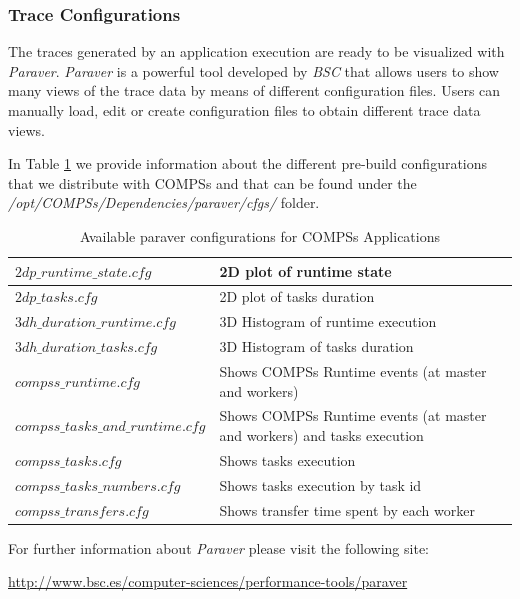 \subsubsection{Trace Configurations}
The traces generated by an application execution are ready to be visualized with \textit{Paraver}. \textit{Paraver} is a powerful 
tool developed by \textit{BSC} that allows users to show many views of the trace data by means of different configuration files.
Users can manually load, edit or create configuration files to obtain different trace data views.

In Table \ref{tab:paraver_configs} we provide information about the different pre-build configurations that we distribute
with COMPSs and that can be found under the \textit{/opt/COMPSs/Dependencies/paraver/cfgs/} folder.

\bgroup
  \def\arraystretch{1.5}
  \begin{table}[h]
    \begin{center}
      \begin{tabular}{| p{} | p{} |}
	\hline
	$2dp\_runtime\_state.cfg$		& 2D plot of runtime state \\ \hline
	$2dp\_tasks.cfg$			& 2D plot of tasks duration \\ \hline
	$3dh\_duration\_runtime.cfg$		& 3D Histogram of runtime execution \\ \hline
	$3dh\_duration\_tasks.cfg$		& 3D Histogram of tasks duration \\ \hline
	$compss\_runtime.cfg$ 			& Shows COMPSs Runtime events (at master and workers) \\ \hline
	$compss\_tasks\_and\_runtime.cfg$ 	& Shows COMPSs Runtime events (at master and workers) and tasks execution \\ \hline
	$compss\_tasks.cfg$ 			& Shows tasks execution \\ \hline
	$compss\_tasks\_numbers.cfg$ 		& Shows tasks execution by task id \\ \hline
	$compss\_transfers.cfg$ 		& Shows transfer time spent by each worker \\ \hline
      \end{tabular}
      \caption{Available paraver configurations for COMPSs Applications}
      \label{tab:paraver_configs}
    \end{center}
  \end{table}
\egroup

For further information about \textit{Paraver} please visit the following site:
\begin{center}
\url{http://www.bsc.es/computer-sciences/performance-tools/paraver}
\end{center}


